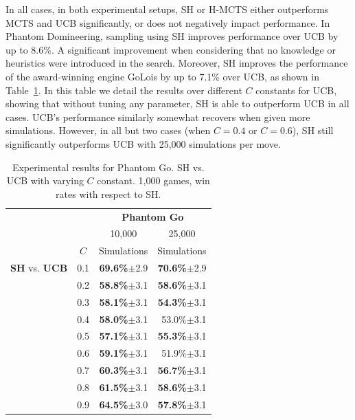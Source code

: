 \documentclass[a4paper]{llncs}
\begin{document}
In all cases, in both experimental setups, SH or H-MCTS either outperforms MCTS and UCB significantly, or does not negatively impact performance. In Phantom Domineering, sampling using SH improves performance over UCB by up to 8.6\%. A significant improvement when considering that no knowledge or heuristics were introduced in the search. Moreover, SH improves the performance of the award-winning engine {\sc GoLois} by up to 7.1\% over UCB, as shown in Table~\ref{tab:ph_go}. In this table we detail the results over different $C$ constants for UCB, showing that without tuning any parameter, SH is able to outperform UCB in all cases. UCB's performance similarly somewhat recovers when given more simulations. However, in all but two cases (when $C=0.4$ or $C=0.6$), SH still significantly outperforms UCB with 25,000 simulations per move. 

\begin{table}[ht]
\centering
\setlength{\tabcolsep}{10pt}
\begin{tabular}{@{}llrr@{}}
\toprule
& & \multicolumn{2}{c}{\textbf{Phantom Go}} \\
& & \multicolumn{1}{c}{10,000} & \multicolumn{1}{c}{25,000} \\
& \multicolumn{1}{c}{$C$} & \multicolumn{1}{c}{Simulations} & \multicolumn{1}{c}{Simulations} \\ [1mm] \cmidrule(l){1-4}
\textbf{SH} vs. \textbf{UCB}  & 0.1 & \textbf{69.6\%}$\pm$2.9 & \textbf{70.6\%}$\pm$2.9 \\ [.5mm]
 & 0.2 & \textbf{58.8\%}$\pm$3.1 & \textbf{58.6\%}$\pm$3.1 \\[.5mm]
 & 0.3 & \textbf{58.1\%}$\pm$3.1 & \textbf{54.3\%}$\pm$3.1 \\[.5mm]
 & 0.4 & \textbf{58.0\%}$\pm$3.1 & 53.0\%$\pm$3.1          \\[.5mm]
 & 0.5 & \textbf{57.1\%}$\pm$3.1 & \textbf{55.3\%}$\pm$3.1 \\[.5mm]
 & 0.6 & \textbf{59.1\%}$\pm$3.1 & 51.9\%$\pm$3.1 \\[.5mm]
 & 0.7 & \textbf{60.3\%}$\pm$3.1 & \textbf{56.7\%}$\pm$3.1 \\[.5mm]
 & 0.8 & \textbf{61.5\%}$\pm$3.1 & \textbf{58.6\%}$\pm$3.1 \\[.5mm]
 & 0.9 & \textbf{64.5\%}$\pm$3.0 & \textbf{57.8\%}$\pm$3.1 \\[.5mm]
\bottomrule
\end{tabular}
\vspace{2mm}
{\caption{Experimental results for Phantom Go. SH vs. UCB with varying $C$ constant. 1,000 games, win rates with respect to SH.} \label{tab:ph_go}}
\end{table}
\end{document}
